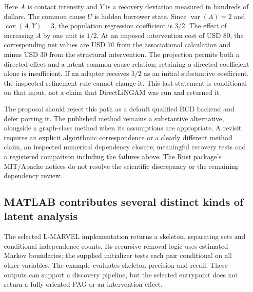 Here \(A\) is contact intensity and \(Y\) is a recovery deviation
measured in hundreds of dollars. The common cause \(U\) is hidden
borrower state. Since \(\operatorname{var}(A)=2\) and
\(\operatorname{cov}(A,Y)=3\), the population regression coefficient is
\(3/2\). The effect of increasing \(A\) by one unit is \(1/2\). At an
imposed intervention cost of USD 80, the corresponding net values are
USD 70 from the associational calculation and minus USD 30 from the
structural intervention. The projection permits both a directed effect
and a latent common-cause relation; retaining a directed coefficient
alone is insufficient. If an adapter receives \(3/2\) as an initial
substantive coefficient, the inspected refinement rule cannot change it.
This last statement is conditional on that input, not a claim that
DirectLiNGAM was run and returned it. \citep{exec14_olatent_oracle}

The proposal should reject this path as a default qualified RCD backend
and defer porting it. The published method remains a substantive
alternative, alongside a graph-class method when its assumptions are
appropriate. A revisit requires an explicit algorithmic correspondence
or a clearly different method claim, an inspected numerical dependency
closure, meaningful recovery tests and a registered comparison including
the failures above. The Rust package's MIT/Apache notices do not resolve
the scientific discrepancy or the remaining dependency review.
\citep{exec14_olatent_varlingam,exec14_olatent_rcd_paper}

\hypertarget{matlab-contributes-several-distinct-kinds-of-latent-analysis}{%
\subsection{MATLAB contributes several distinct kinds of latent
analysis}\label{matlab-contributes-several-distinct-kinds-of-latent-analysis}}

The selected L-MARVEL implementation returns a skeleton, separating sets
and conditional-independence counts. Its recursive removal logic uses
estimated Markov boundaries; the supplied initializer tests each pair
conditional on all other variables. The example evaluates skeleton
precision and recall. These outputs can support a discovery pipeline,
but the selected entrypoint does not return a fully oriented PAG or an
intervention effect. \citep{exec14_olatent_lmarvel}

